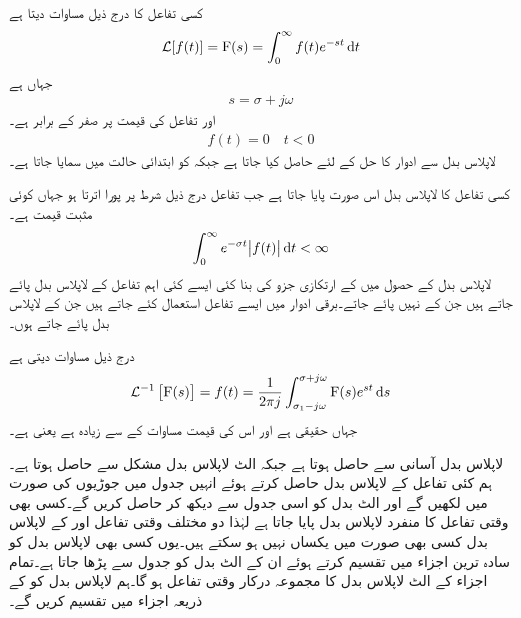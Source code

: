 
کسی تفاعل  کا  درج ذیل مساوات دیتا ہے
\begin{align}\label{مساوات_لاپلاس_بدل_تعارف}
\Laplace[f(t)]=\bF(s)=\int_0^{\infty} f(t) e^{-st}\dif t
\end{align}
جہاں   ہے
\begin{align}
s=\sigma+j\omega
\end{align}
اور تفاعل  کی قیمت  پر صفر کے برابر ہے۔
\begin{align}
f(t)=0\quad t<0
\end{align}
لاپلاس بدل سے ادوار کا حل  کے لئے حاصل کیا جاتا ہے جبکہ  کو ابتدائی حالت میں سمایا جاتا ہے۔  

کسی تفاعل کا لاپلاس بدل اس صورت پایا جاتا ہے جب تفاعل درج ذیل شرط پر پورا اترتا ہو جہاں  کوئی مثبت قیمت ہے۔
\begin{align}\label{مساوات_لاپلاس_شرط_بدل_پایا_جاتا_ہے}
\int_0^{\infty} e^{-\sigma t}\abs{f(t)}\dif t<\infty
\end{align}
لاپلاس بدل کے حصول میں  کے ارتکازی جزو  کی بنا کئی ایسے کئی اہم تفاعل کے لاپلاس بدل پائے جاتے ہیں جن کے  نہیں پائے جاتے۔برقی ادوار میں ایسے تفاعل استعمال کئے جاتے ہیں جن کے لاپلاس بدل پائے جاتے ہوں۔

 درج ذیل مساوات دیتی ہے
\begin{align}
\Laplace^{-1}\left[\bF(s)\right]=f(t)=\frac{1}{2\pi j}\int_{\sigma_1-j\omega}^{\sigma+j\omega} \bF(s) e^{st} \dif s
\end{align}
 جہاں  حقیقی ہے اور اس کی قیمت مساوات  کے  سے زیادہ ہے یعنی  ہے۔

لاپلاس بدل آسانی سے حاصل ہوتا ہے جبکہ الٹ لاپلاس بدل مشکل سے حاصل ہوتا ہے۔ہم کئی تفاعل کے لاپلاس بدل حاصل کرتے ہوئے انہیں جدول میں جوڑیوں کی صورت میں لکھیں گے اور الٹ بدل کو اسی جدول سے دیکھ کر حاصل کریں گے۔کسی بھی وقتی تفاعل  کا منفرد لاپلاس بدل  پایا جاتا ہے لہٰذا دو مختلف وقتی تفاعل  اور  کے لاپلاس بدل کسی بھی صورت میں یکساں نہیں ہو سکتے ہیں۔یوں کسی بھی لاپلاس بدل  کو سادہ ترین اجزاء میں تقسیم کرتے ہوئے ان کے الٹ بدل کو جدول سے پڑھا جاتا ہے۔تمام اجزاء کے الٹ لاپلاس بدل کا مجموعہ درکار وقتی تفاعل ہو گا۔ہم لاپلاس بدل کو  کے ذریعہ اجزاء میں تقسیم کریں گے۔

